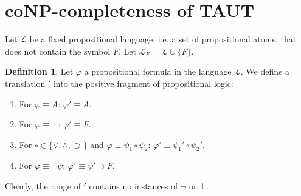 \documentclass[a4paper,10pt]{article}
\newcommand{\imp}{\supset}
\renewcommand{\L}{\mathcal{L}}
\newcommand{\Lf}{\L_F}
\theoremstyle{definition}
\newtheorem{definition}[theorem]{Definition}
\begin{document}
\section{coNP-completeness of TAUT}

Let $\L$ be a fixed propositional language, i.e. a set of propositional atoms, that does not contain the symbol $F$. Let $\Lf = \L ∪ \{F\}$.
\begin{definition}
 Let $φ$ a propositional formula in the language $\L$. We define a translation $'$ into the positive fragment of propositional logic:
 \begin{enumerate}
  \item For $φ \equiv A$: $φ' \equiv A$.
  \item For $φ \equiv \bot$: $φ' \equiv F$.
  \item For $\circ \in \{∨,∧,\imp\}$ and $φ \equiv ψ_1 \circ ψ_2$: $φ' \equiv ψ_1' \circ ψ_2'$.
  \item For $φ \equiv ¬ψ$: $φ' \equiv ψ' \imp F$.
 \end{enumerate}
\end{definition}

Clearly, the range of $'$ contains no instances of $¬$ or $\bot$.
\end{document}
